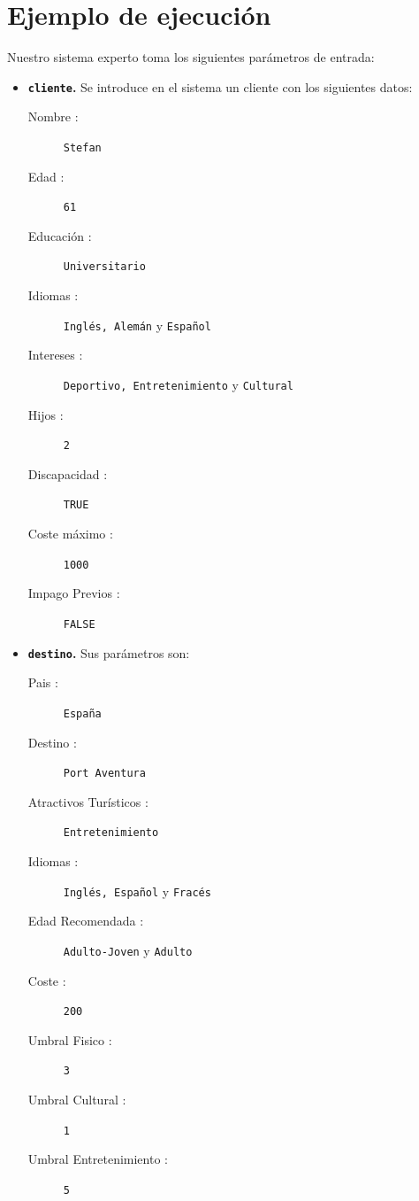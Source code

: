 \documentclass[10pt,a4paper]{report}
\begin{document}
	\chapter{Ejemplo de ejecución}
	Nuestro sistema experto toma los siguientes parámetros de entrada:
	\begin{itemize}
	\item \textbf{\texttt{cliente}.} Se introduce en el sistema un cliente con los siguientes datos:
		\begin{description}
			\item[Nombre :] \texttt{Stefan}
			\item[Edad :] \texttt{61}
			\item[Educación :] \texttt{Universitario}
			\item[Idiomas :] \texttt{Inglés, Alemán} y \texttt{Español}
			\item[Intereses :] \texttt{Deportivo, Entretenimiento} y \texttt{Cultural}
			\item[Hijos :] \texttt{2}
			\item[Discapacidad :] \texttt{TRUE}
			\item[Coste máximo :] \texttt{1000}
			\item[Impago Previos :] \texttt{FALSE}
		\end{description}
	
	
	\item \textbf{\texttt{destino}.} Sus parámetros son:
		\begin{description}
			\item[Pais :] \texttt{España}
			\item[Destino :] \texttt{Port Aventura}
			\item[Atractivos Turísticos :] \texttt{Entretenimiento}
			\item[Idiomas :] \texttt{Inglés, Español} y \texttt{Fracés}
			\item[Edad Recomendada :] \texttt{Adulto-Joven} y \texttt{Adulto}
			\item[Coste :] \texttt{200}
			\item[Umbral Fisico :] \texttt{3}
			\item[Umbral Cultural :] \texttt{1}
			\item[Umbral Entretenimiento :] \texttt{5}
		\end{description}
	

\end{itemize}
\end{document}
